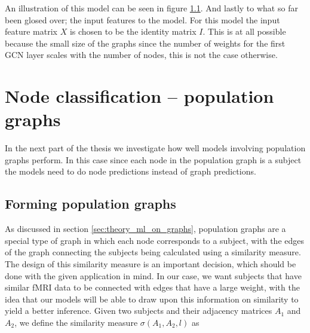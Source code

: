 An illustration of this model can be seen in figure \ref{}. And lastly to what so far been glosed over; the input features to the model. For this model the input feature matrix $X$ is chosen to be the identity matrix $I$. This is at all possible because the small size of the graphs since the number of weights for the first GCN layer scales with the number of nodes, this is not the case otherwise.


\section{Node classification -- population graphs}
In the next part of the thesis we investigate how well models involving population graphs perform. In this case since each node in the population graph is a subject the models need to do node predictions instead of graph predictions. 

\subsection{Forming population graphs}

As discussed in section \ref{sec:theory_ml_on_graphs}, population graphs are a special type of graph in which each node corresponds to a subject, with the edges of the graph connecting the subjects being calculated using a similarity measure. The design of this similarity measure is an important decision, which should be done with the given application in mind. In our case, we want subjects that have similar fMRI data to be connected with edges that have a large weight, with the idea that our models will be able to draw upon this information on similarity to yield a better inference. Given two subjects and their adjacency matrices $A_1$ and $A_2$, we define the similarity measure $\sigma\left(A_1, A_2, l\right)$ as

